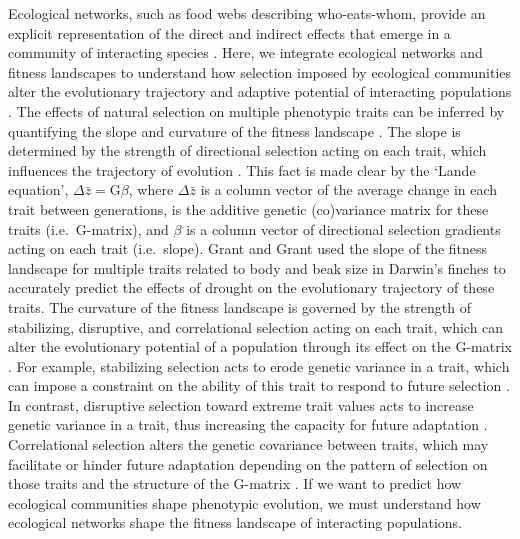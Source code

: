 \documentclass[11pt,]{article}
\begin{document}
Ecological networks, such as food webs describing who-eats-whom, provide
an explicit representation of the direct and indirect effects that
emerge in a community of interacting species
\citep{Bascompte2014, McCann2012}. Here, we integrate ecological
networks and fitness landscapes to understand how selection imposed by
ecological communities alter the evolutionary trajectory and adaptive
potential of interacting populations \citep{Hui2018}. The effects of
natural selection on multiple phenotypic traits can be inferred by
quantifying the slope and curvature of the fitness landscape
\citep{Arnold1992}. The slope is determined by the strength of
directional selection acting on each trait, which influences the
trajectory of evolution \citep{Lande1979, Arnold1992}. This fact is made
clear by the `Lande equation', \(\Delta\bar z = \text{G}\beta\), where
\(\Delta \bar z\) is a column vector of the average change in each trait
between generations,  is the additive genetic (co)variance
matrix for these traits (i.e.~G-matrix), and \(\beta\) is a column
vector of directional selection gradients acting on each trait
(i.e.~slope). Grant and Grant \citeyearpar{Grant1995} used the slope of
the fitness landscape for multiple traits related to body and beak size
in Darwin's finches to accurately predict the effects of drought on the
evolutionary trajectory of these traits. The curvature of the fitness
landscape is governed by the strength of stabilizing, disruptive, and
correlational selection acting on each trait, which can alter the
evolutionary potential of a population through its effect on the
G-matrix \citep{Hansen2008}. For example, stabilizing selection acts to
erode genetic variance in a trait, which can impose a constraint on the
ability of this trait to respond to future selection \citep{Hansen2008}.
In contrast, disruptive selection toward extreme trait values acts to
increase genetic variance in a trait, thus increasing the capacity for
future adaptation \citep{Bolnick2008}. Correlational selection alters
the genetic covariance between traits, which may facilitate or hinder
future adaptation depending on the pattern of selection on those traits
and the structure of the G-matrix \citep{Brodie1992}. If we want to
predict how ecological communities shape phenotypic evolution, we must
understand how ecological networks shape the fitness landscape of
interacting populations.
\end{document}
